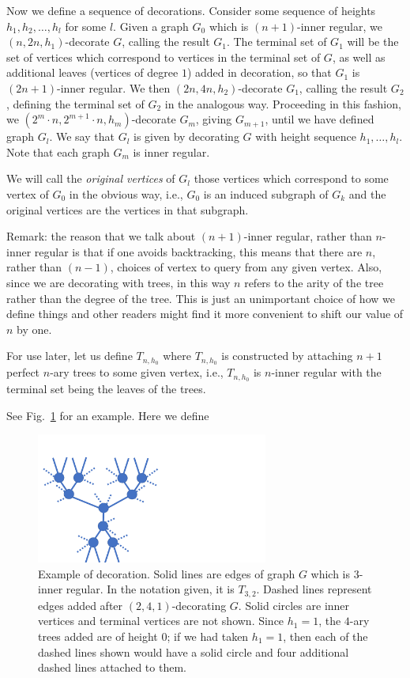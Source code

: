 \documentclass[letterpaper,onecolumn]{quantumarticle}
\begin{document}
Now we define a sequence of decorations.  Consider some sequence of heights $h_1,h_2,\ldots,h_l$ for some $l$.  Given a graph $G_0$ which is $(n+1)$-inner regular, we $(n,2n,h_1)$-decorate $G$, calling the result $G_1$.  
The terminal set of $G_1$ will be the set of vertices which correspond to vertices in the terminal set of $G$, as well as additional leaves (vertices of degree $1$) added in decoration, so that $G_1$ is $(2n+1)$-inner regular.
We then $(2n,4n,h_2)$-decorate $G_1$, calling the result $G_2$, defining the terminal set of $G_2$ in the analogous way.
Proceeding in this fashion, we $(2^m\cdot n,2^{m+1}\cdot n,h_m)$-decorate $G_m$, giving $G_{m+1}$, until we have defined graph $G_l$.  We say that $G_l$ is given by decorating $G$ with height sequence $h_1,\ldots,h_l$.
Note that each graph $G_m$ is inner regular.

We will call the {\it original vertices} of $G_l$ those vertices which correspond to some vertex of $G_0$ in the obvious way, i.e., $G_0$ is an induced subgraph of $G_k$ and the original vertices are the vertices in that subgraph.

Remark: the reason that we talk about $(n+1)$-inner regular, rather than $n$-inner regular is that if one avoids backtracking, this means that there are $n$, rather than $(n-1)$, choices of vertex to query from any given vertex.  
Also, since we are decorating with trees, in this way $n$ refers to the arity of the tree rather than the degree of the tree.
This is just an unimportant choice of how we define things and other readers might find it more convenient to shift our value of $n$ by one.
 
For use later, let us define 
$T_{n,h_0}$ where $T_{n,h_0}$ is constructed by attaching $n+1$ perfect $n$-ary trees to some given vertex, i.e., $T_{n,h_0}$ is $n$-inner regular with the terminal set being the leaves of the trees.

See Fig.~\ref{figdec} for an example. Here we define

\begin{figure}
\includegraphics[width=3in]{tree.pdf}
\caption{Example of decoration.  Solid lines are edges of graph $G$ which is $3$-inner regular.
In the notation given, it is $T_{3,2}$.  Dashed lines represent edges added after $(2,4,1)$-decorating $G$.  Solid circles are inner vertices and terminal vertices are not shown.
Since $h_1=1$, the $4$-ary trees added are of height $0$; if we had taken $h_1=1$, then each of the dashed lines shown would have a solid circle and four additional dashed lines attached to them.}
\label{figdec}
\end{figure}
\end{document}
